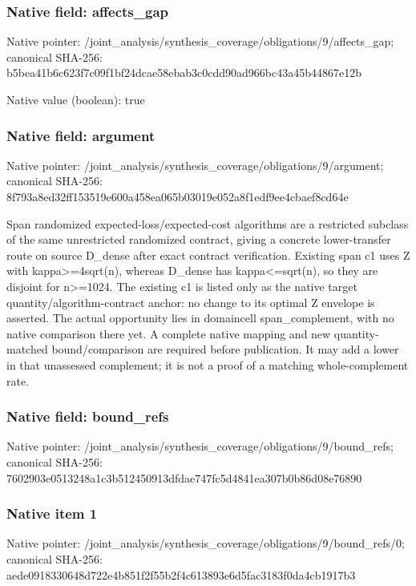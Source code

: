 \documentclass[10pt,a4paper]{article}
\begin{document}
\subsubsection{Native field: affects\_\allowbreak{}gap}
Native pointer: /joint\_\allowbreak{}analysis/synthesis\_\allowbreak{}coverage/obligations/9/affects\_\allowbreak{}gap; canonical SHA-256: b5bea41b6c623f7c09f1bf24dcae58ebab3c0cdd90ad966bc43a45b44867e12b

Native value (boolean): true

\subsubsection{Native field: argument}
Native pointer: /joint\_\allowbreak{}analysis/synthesis\_\allowbreak{}coverage/obligations/9/argument; canonical SHA-256: 8f793a8ed32ff153519e600a458ea065b03019e052a8f1edf9ee4cbaef8cd64e

\begingroup\raggedright\sloppy Span randomized expected-loss/\allowbreak{}expected-cost algorithms are a restricted subclass of the same unrestricted randomized contract,\allowbreak{} giving a concrete lower-transfer route on source D\_\allowbreak{}dense after exact contract verification. Existing span c1 uses Z with kappa>=\allowbreak{}4sqrt(n),\allowbreak{} whereas D\_\allowbreak{}dense has kappa<=\allowbreak{}sqrt(n),\allowbreak{} so they are disjoint for n>=\allowbreak{}1024. The existing c1 is listed only as the native target quantity/\allowbreak{}algorithm-contract anchor:\allowbreak{} no change to its optimal Z envelope is asserted. The actual opportunity lies in domaincell span\_\allowbreak{}complement,\allowbreak{} with no native comparison there yet. A complete native mapping and new quantity-matched bound/\allowbreak{}comparison are required before publication. It may add a lower in that unassessed complement;\allowbreak{} it is not a proof of a matching whole-complement rate.\par\endgroup

\subsubsection{Native field: bound\_\allowbreak{}refs}
Native pointer: /joint\_\allowbreak{}analysis/synthesis\_\allowbreak{}coverage/obligations/9/bound\_\allowbreak{}refs; canonical SHA-256: 7602903e0513248a1c3b512450913dfdae747fc5d4841ea307b0b86d08e76890

\subsubsection{Native item 1}
Native pointer: /joint\_\allowbreak{}analysis/synthesis\_\allowbreak{}coverage/obligations/9/bound\_\allowbreak{}refs/0; canonical SHA-256: aede0918330648d722e4b851f2f55b2f4c613893e6d5fac3183f0da4cb1917b3
\end{document}
